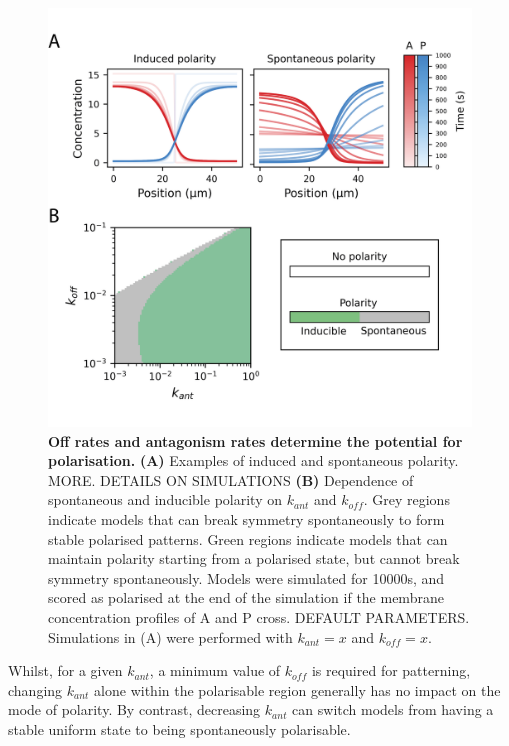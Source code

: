 \documentclass[12pt]{"report"}
\newcommand{\mycaption}[2]{\caption[#1]{\textbf{#1.} #2}}
\begin{document}
\begin{figure}
\includegraphics[scale=1]{goehring_model_kant_koff_triggering}
\centering
\mycaption{Off rates and antagonism rates determine the potential for polarisation}{
\textbf{(A)} Examples of induced and spontaneous polarity. MORE. DETAILS ON SIMULATIONS
\textbf{(B)} Dependence of spontaneous and inducible polarity on $k_{ant}$ and $k_{off}$. 
Grey regions indicate models that can break symmetry spontaneously to form stable polarised patterns. Green regions indicate models that can maintain polarity starting from a polarised state, but cannot break symmetry spontaneously. Models were simulated for 10000s, and scored as polarised at the end of the simulation if the membrane concentration profiles of A and P cross. DEFAULT PARAMETERS. Simulations in (A) were performed with $k_{ant} = x$ and $k_{off} = x$.
}
\label{fig:goehring_model_kant_koff_triggering}
\end{figure}

Whilst, for a given $k_{ant}$, a minimum value of $k_{off}$ is required for patterning, changing $k_{ant}$ alone within the polarisable region generally has no impact on the mode of polarity. By contrast, decreasing $k_{ant}$ can switch models from having a stable uniform state to being spontaneously polarisable. \\
\end{document}
